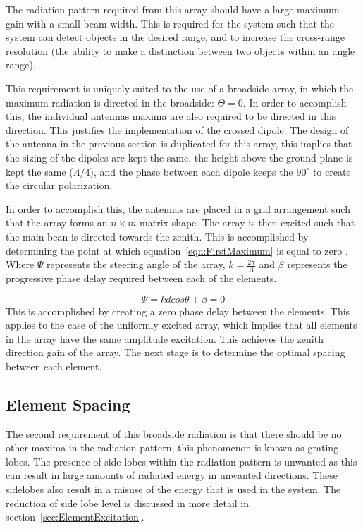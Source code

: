 \documentclass[11pt]{witseiepaper}
\begin{document}
The radiation pattern required from this array should have a large maximum gain with a small beam width. This is required for the system such that the system can detect objects in the desired range, and to increase the cross-range resolution (the ability to make a distinction between two objects within an angle range).

This requirement is uniquely suited to the use of a broadside array, in which the maximum radiation is directed in the broadside: $\Theta = 0$.
In order to accomplish this, the individual antennas maxima are also required to be directed in this direction. This justifies the implementation of the crossed dipole.
The design of the antenna in the previous section is duplicated for this array, this implies that the sizing of the dipoles are kept the same, the height above the ground plane is kept the same ($\Lambda /4$), and the phase between each dipole keeps the $90^{\circ}$ to create the circular polarization.


In order to accomplish this, the antennas are placed in a grid arrangement such that the array forms an $n \times m$ matrix shape.
The array is then excited such that the main bean is directed towards the zenith. This is accomplished by determining the point at which equation~\ref{eqn:FirstMaximum}
is equal to zero \cite[p.~296]{Balanis}. Where $\Psi$ represents the steering angle of the array, $k = \frac{2 \pi}{\Lambda}$ and $\beta$ represents the progressive phase delay required between each of the elements.

\begin{equation} \label{eqn:FirstMaximum}
\Psi = k d cos \theta + \beta = 0
\end{equation}
This is accomplished by creating a zero phase delay between the elements. This applies to the case of the uniformly excited array, which implies that all elements in the array have the same amplitude excitation.
This achieves the zenith direction gain of the array. The next stage is to determine the optimal spacing between each element.


\subsection{Element Spacing} \label{sec:ElementSpacing}
The second requirement of this broadside radiation is that there should be no other maxima in the radiation pattern, this phenomenon is known as grating lobes.
The presence of side lobes within the radiation pattern is unwanted as this can result in large amounts of radiated energy in unwanted directions. These sidelobes also result in a misuse of the energy that is used in the system.
The reduction of side lobe level is discussed in more detail in section~\ref{sec:ElementExcitation}.
\end{document}
